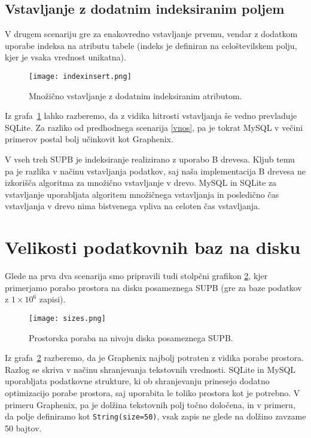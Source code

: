 \documentclass[a4paper,12pt,openright]{book}
\begin{document}
    \subsection{Vstavljanje z dodatnim indeksiranim poljem}

    V drugem scenariju gre za enakovredno vstavljanje prvemu, vendar z dodatkom uporabe indeksa na atributu tabele (indeks je definiran na celoštevilskem polju, kjer je vsaka vrednost unikatna).
    
    \begin{figure}[H]
        \centerline{\texttt{[image: indexinsert.png]}}
        \caption{Množično vstavljanje z dodatnim indeksiranim atributom.}
        \label{index_vnos}
    \end{figure}

    \noindent
    Iz grafa~\ref{index_vnos} lahko razberemo, da z vidika hitrosti vstavljanja še vedno prevladuje SQLite. Za razliko od predhodnega scenarija \ref{vnos}, pa je tokrat MySQL v večini primerov postal bolj učinkovit kot Graphenix.

    V vseh treh SUPB je indeksiranje realizirano z uporabo B drevesa. Kljub temu pa je razlika v načinu vstavljanja podatkov, saj naša implementacija B drevesa ne izkorišča algoritma za množično vstavljanje v drevo. MySQL in SQLite za vstavljanje uporabljata algoritem množičnega vstavljanja in posledično čas vstavljanja v drevo nima bistvenega vpliva na celoten čas vstavljanja.
 
    \section{Velikosti podatkovnih baz na disku}
    \label{size_analysis}

    Glede na prva dva scenarija smo pripravili tudi stolpčni grafikon \ref{velikosti}, kjer primerjamo porabo prostora na disku posameznega SUPB (gre za baze podatkov z $1 \times 10^6$ zapisi). 
    
    \begin{figure}[H]
        \centerline{\texttt{[image: sizes.png]}}
        \caption{Prostorska poraba na nivoju diska posameznega SUPB.}
        \label{velikosti}
    \end{figure}

    \noindent
    Iz grafa~\ref{velikosti} razberemo, da je Graphenix najbolj potraten z vidika porabe prostora. Razlog se skriva v načinu shranjevanja tekstovnih vrednosti. SQLite in MySQL uporabljata podatkovne strukture, ki ob shranjevanju prinesejo dodatno optimizacijo porabe prostora, saj uporabita le toliko prostora kot je potrebno. V primeru Graphenix, pa je dolžina tekstovnih polj točno določena, in v primeru, da polje definiramo kot {\tt String(size=50)}, vsak zapis ne glede na dolžino zavzame 50 bajtov.
\end{document}
